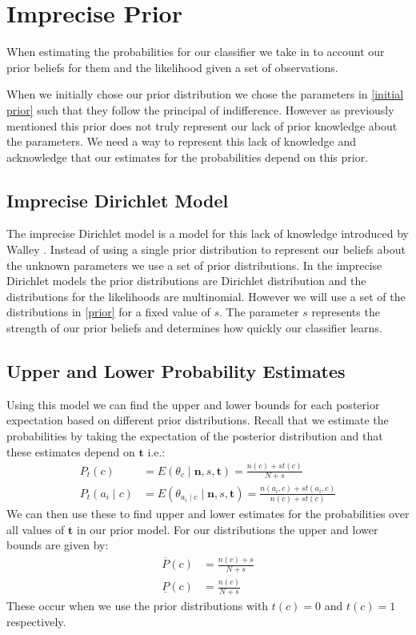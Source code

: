 \newcommand{\sn}[2]{\ensuremath{{#1}\times 10^{#2}}}

\chapter{Imprecise Prior}

When estimating the probabilities for our classifier we take in to account our prior beliefs for them and the likelihood given a set of observations.

When we initially chose our prior distribution we chose the parameters in \cref{initial prior} such that they follow the principal of indifference.
However as previously mentioned this prior does not truly represent our lack of prior knowledge about the parameters.
We need a way to represent this lack of knowledge and acknowledge that our estimates for the probabilities depend on this prior.

\section{Imprecise Dirichlet Model}

The imprecise Dirichlet model is a model for this lack of knowledge introduced by Walley \cite{Walley96}.
Instead of using a single prior distribution to represent our beliefs about the unknown parameters we use a set of prior distributions.
In the imprecise Dirichlet models the prior distributions are Dirichlet distribution and the distributions for the likelihoods are multinomial.
However we will use a set of the distributions in \cref{prior} for a fixed value of $s$.
The parameter $s$ represents the strength of our prior beliefs and determines how quickly our classifier learns.

\section{Upper and Lower Probability Estimates}

Using this model we can find the upper and lower bounds for each posterior expectation based on different prior distributions.
Recall that we estimate the probabilities by taking the expectation of the posterior distribution and that these estimates depend on $\mathbf{t}$ i.e.:
\begin{align}
	P_t(c) & = E(\theta_c \mid \mathbf{n},s,\mathbf{t}) = \frac{n(c) + st(c)}{N + s} \\
	P_t(a_i \mid c) & = E(\theta_{a_i \mid c} \mid \mathbf{n},s,\mathbf{t}) = \frac{n(a_i, c) + st(a_i, c)}{n(c) + st(c)}
\end{align}
We can then use these to find upper and lower estimates for the probabilities over all values of $\mathbf{t}$ in our prior model.
For our distributions the upper and lower bounds are given by:
\begin{align}
	\overline{P}(c) & = \frac{n(c) + s}{N+s} \\
	\underline{P}(c) & = \frac{n(c)}{N+s}
\end{align}
These occur when we use the prior distributions with $t(c) = 0$ and $t(c) = 1$ respectively.

